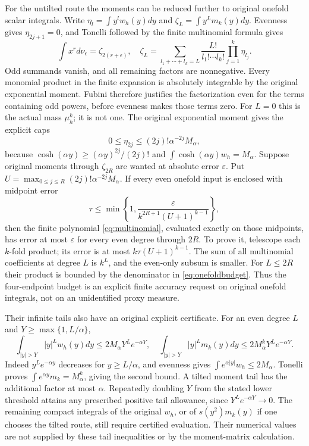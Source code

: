 \documentclass[11pt]{article}
\begin{document}
For the untilted route the moments can be reduced further to
original onefold scalar integrals. Write
$\eta_l=\int y^lw_h(y)dy$ and
$\zeta_L=\int y^Lm_k(y)dy$. Evenness gives $\eta_{2j+1}=0$,
and Tonelli followed by the finite multinomial formula gives
\begin{equation}\label{eq:multinomial}
 \int x^r d\nu_\epsilon=\zeta_{2(r+\epsilon)},\quad
 \zeta_L=\sum_{l_1+\cdots+l_k=L}
 \frac{L!}{l_1!\cdots l_k!}\prod_{j=1}^k\eta_{l_j}.
\end{equation}
Odd summands vanish, and all remaining factors are nonnegative.
Every monomial product in the finite expansion is absolutely
integrable by the original exponential moment. Fubini therefore
justifies the factorization even for the terms containing odd
powers, before evenness makes those terms zero.
For $L=0$ this is the actual mass $\mu_h^k$; it is not one.
The original exponential moment gives the explicit caps
\begin{equation}\label{eq:etaone}
 0\le\eta_{2j}\le(2j)!\alpha^{-2j}M_\alpha,
\end{equation}
because $\cosh(\alpha y)\ge(\alpha y)^{2j}/(2j)!$ and
$\int\cosh(\alpha y)w_h=M_\alpha$.
Suppose original moments through $\zeta_{2R}$ are wanted at
absolute error $\varepsilon$. Put
$U=\max_{0\le j\le R}(2j)!\alpha^{-2j}M_\alpha$.
If every even onefold input is enclosed with midpoint error
\begin{equation}\label{eq:onefoldbudget}
 \tau\le\min\left\{1,
 \frac{\varepsilon}{k^{2R+1}(U+1)^{k-1}}\right\},
\end{equation}
then the finite polynomial \eqref{eq:multinomial}, evaluated
exactly on those midpoints, has error at most $\varepsilon$
for every even degree through $2R$. To prove it, telescope each
$k$-fold product; its error is at most
$k\tau(U+1)^{k-1}$. The sum of all multinomial coefficients
at degree $L$ is $k^L$, and the even-only subsum is smaller.
For $L\le2R$ their product is bounded by the denominator in
\eqref{eq:onefoldbudget}. Thus the four-endpoint budget is an
explicit finite accuracy request on original onefold integrals,
not on an unidentified proxy measure.

Their infinite tails also have an original explicit certificate.
For an even degree $L$ and $Y\ge\max\{1,L/\alpha\}$,
\begin{equation}\label{eq:tail}
 \int_{|y|>Y}|y|^Lw_h(y)dy
 \le2M_\alpha Y^Le^{-\alpha Y},\quad
 \int_{|y|>Y}|y|^Lm_k(y)dy
 \le2M_\alpha^kY^Le^{-\alpha Y}.
\end{equation}
Indeed $y^Le^{-\alpha y}$ decreases for $y\ge L/\alpha$,
and evenness gives $\int e^{\alpha|y|}w_h\le2M_\alpha$.
Tonelli proves $\int e^{\alpha y}m_k=M_\alpha^k$, giving
the second bound. A tilted moment tail has the additional factor
at most $\alpha$. Repeatedly doubling $Y$ from the stated lower
threshold attains any prescribed positive tail allowance, since
$Y^Le^{-\alpha Y}\to0$. The remaining compact integrals of
the original $w_h$, or of $s(y^2)m_k(y)$ if one chooses the
tilted route, still require certified evaluation. Their numerical
values are not supplied by these tail inequalities or by the
moment-matrix calculation.
\end{document}
